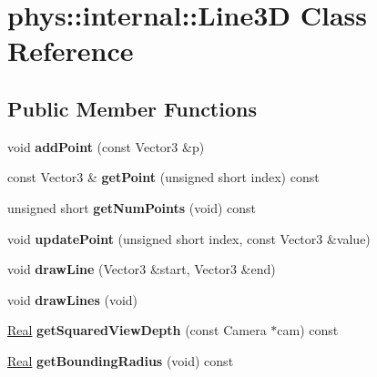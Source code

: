 \hypertarget{classphys_1_1internal_1_1Line3D}{
\section{phys::internal::Line3D Class Reference}
\label{d4/db5/classphys_1_1internal_1_1Line3D}
}
\subsection*{Public Member Functions}
\begin{DoxyCompactItemize}
\item 
\hypertarget{classphys_1_1internal_1_1Line3D_aeb3b828b35b4c8ed76158285be6ddc67}{
void {\bfseries addPoint} (const Vector3 \&p)}
\label{d4/db5/classphys_1_1internal_1_1Line3D_aeb3b828b35b4c8ed76158285be6ddc67}

\item 
\hypertarget{classphys_1_1internal_1_1Line3D_a3a94450be2bacd0c17d44db011070ece}{
const Vector3 \& {\bfseries getPoint} (unsigned short index) const }
\label{d4/db5/classphys_1_1internal_1_1Line3D_a3a94450be2bacd0c17d44db011070ece}

\item 
\hypertarget{classphys_1_1internal_1_1Line3D_a1c8b1bdae1db25d6f27ff2d1ebf38bee}{
unsigned short {\bfseries getNumPoints} (void) const }
\label{d4/db5/classphys_1_1internal_1_1Line3D_a1c8b1bdae1db25d6f27ff2d1ebf38bee}

\item 
\hypertarget{classphys_1_1internal_1_1Line3D_a99e726bf689a3afa6439a9fd6d940a76}{
void {\bfseries updatePoint} (unsigned short index, const Vector3 \&value)}
\label{d4/db5/classphys_1_1internal_1_1Line3D_a99e726bf689a3afa6439a9fd6d940a76}

\item 
\hypertarget{classphys_1_1internal_1_1Line3D_a0320e600b9f363036c63eb47527bb854}{
void {\bfseries drawLine} (Vector3 \&start, Vector3 \&end)}
\label{d4/db5/classphys_1_1internal_1_1Line3D_a0320e600b9f363036c63eb47527bb854}

\item 
\hypertarget{classphys_1_1internal_1_1Line3D_a008f0874c2213002e0c39330561f80f2}{
void {\bfseries drawLines} (void)}
\label{d4/db5/classphys_1_1internal_1_1Line3D_a008f0874c2213002e0c39330561f80f2}

\item 
\hypertarget{classphys_1_1internal_1_1Line3D_a04b77721c599bb368c791da7621fc814}{
\hyperlink{namespacephys_af7eb897198d265b8e868f45240230d5f}{Real} {\bfseries getSquaredViewDepth} (const Camera $\ast$cam) const }
\label{d4/db5/classphys_1_1internal_1_1Line3D_a04b77721c599bb368c791da7621fc814}

\item 
\hypertarget{classphys_1_1internal_1_1Line3D_a3fdd0ff2b7b22cebc71f796431afc7c8}{
\hyperlink{namespacephys_af7eb897198d265b8e868f45240230d5f}{Real} {\bfseries getBoundingRadius} (void) const }
\label{d4/db5/classphys_1_1internal_1_1Line3D_a3fdd0ff2b7b22cebc71f796431afc7c8}

\end{DoxyCompactItemize}
